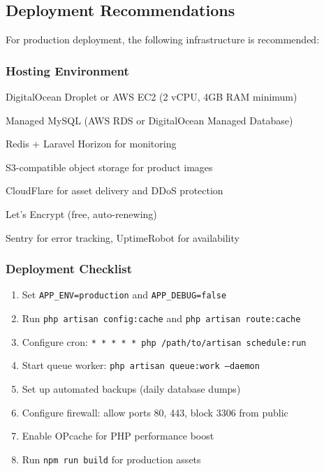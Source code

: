 \subsection{Deployment Recommendations}

For production deployment, the following infrastructure is recommended:

\subsubsection{Hosting Environment}

\begin{description}[leftmargin=3cm,style=nextline]
    \item[Application Server] DigitalOcean Droplet or AWS EC2 (2 vCPU, 4GB RAM minimum)
    \item[Database] Managed MySQL (AWS RDS or DigitalOcean Managed Database)
    \item[Queue Worker] Redis + Laravel Horizon for monitoring
    \item[File Storage] S3-compatible object storage for product images
    \item[CDN] CloudFlare for asset delivery and DDoS protection
    \item[SSL Certificate] Let's Encrypt (free, auto-renewing)
    \item[Monitoring] Sentry for error tracking, UptimeRobot for availability
\end{description}

\subsubsection{Deployment Checklist}

\begin{enumerate}
    \item Set \texttt{APP\_ENV=production} and \texttt{APP\_DEBUG=false}
    \item Run \texttt{php artisan config:cache} and \texttt{php artisan route:cache}
    \item Configure cron: \texttt{* * * * * php /path/to/artisan schedule:run}
    \item Start queue worker: \texttt{php artisan queue:work --daemon}
    \item Set up automated backups (daily database dumps)
    \item Configure firewall: allow ports 80, 443, block 3306 from public
    \item Enable OPcache for PHP performance boost
    \item Run \texttt{npm run build} for production assets
\end{enumerate}


